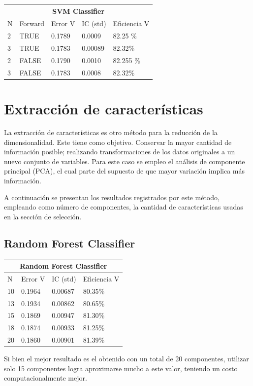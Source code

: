 \documentclass[conference]{IEEEtran}
\begin{document}
\begin{table}[h]
\centering
\begin{tabular}{lllll}
\hline
\multicolumn{5}{c}{\textbf{SVM Classifier}} \\ \hline
N & Forward & Error V & IC (std) & Eficiencia V \\ \hline
2 & TRUE &  0.1789  & 0.0009  &82.25 \% \\
3 & TRUE &  0.1783 & 0.00089  & 82.32\% \\
2 & FALSE & 0.1790 & 0.0010 & 82.255 \% \\
3 & FALSE & 0.1783 & 0.0008 & 82.32\% \\ \hline
\end{tabular}
\end{table}

\section{Extracción de características}
La extracción de características es otro método para la reducción de la dimensionalidad. Este tiene como  objetivo. Conservar la mayor cantidad de información posible; realizando transformaciones de los datos originales a un nuevo conjunto de variables. Para este caso se empleo el análisis de componente principal (PCA), el cual parte del supuesto de que mayor variación implica más información.

A continuación se presentan los resultados registrados por este método, empleando como número de componentes, la cantidad de características usadas en la sección de selección.

\subsection{Random Forest Classifier}\hfill
\begin{table}[h]
\centering
\begin{tabular}{llll}
\hline
\multicolumn{4}{c}{\textbf{Random Forest Classifier}} \\ \hline
N & Error V & IC (std) & Eficiencia V \\ \hline
10 & 0.1964 & 0.00687 & 80.35\% \\
13 & 0.1934 & 0.00862 & 80.65\% \\
15 & 0.1869 & 0.00947 & 81.30\% \\
18 & 0.1874 & 0.00933 & 81.25\% \\
20 & 0.1860 & 0.00901 & 81.39\% \\\hline
\end{tabular}
\end{table}
\newline
\newline
Si bien el mejor resultado es el obtenido con un total de 20 componentes, utilizar solo 15 componentes logra aproximarse mucho a este valor, teniendo un costo computacionalmente mejor.
\end{document}
